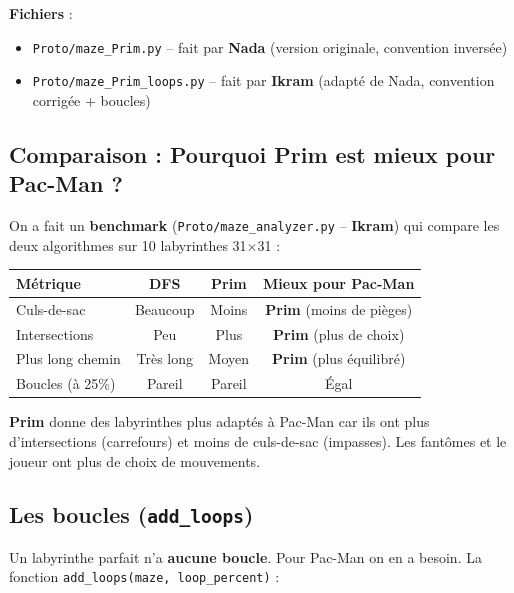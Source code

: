 \documentclass[12pt,a4paper]{article}
\begin{document}
\textbf{Fichiers} :
\begin{itemize}
    \item \texttt{Proto/maze\_Prim.py} -- fait par \textbf{Nada} (version originale, convention inversée)
    \item \texttt{Proto/maze\_Prim\_loops.py} -- fait par \textbf{Ikram} (adapté de Nada, convention corrigée + boucles)
\end{itemize}

\subsection{Comparaison : Pourquoi Prim est mieux pour Pac-Man ?}

On a fait un \textbf{benchmark} (\texttt{Proto/maze\_analyzer.py} -- \textbf{Ikram}) qui compare les deux algorithmes sur 10 labyrinthes 31$\times$31 :

\begin{center}
\begin{tabular}{lccc}
\toprule
\textbf{Métrique} & \textbf{DFS} & \textbf{Prim} & \textbf{Mieux pour Pac-Man} \\
\midrule
Culs-de-sac & Beaucoup & Moins & \textbf{Prim} (moins de pièges) \\
Intersections & Peu & Plus & \textbf{Prim} (plus de choix) \\
Plus long chemin & Très long & Moyen & \textbf{Prim} (plus équilibré) \\
Boucles (à 25\%) & Pareil & Pareil & Égal \\
\bottomrule
\end{tabular}
\end{center}

\begin{choixbox}
\textbf{Prim} donne des labyrinthes plus adaptés à Pac-Man car ils ont plus d'intersections (carrefours) et moins de culs-de-sac (impasses). Les fantômes et le joueur ont plus de choix de mouvements.
\end{choixbox}

\subsection{Les boucles (\texttt{add\_loops})}

Un labyrinthe parfait n'a \textbf{aucune boucle}. Pour Pac-Man on en a besoin. La fonction \texttt{add\_loops(maze, loop\_percent)} :
\end{document}
